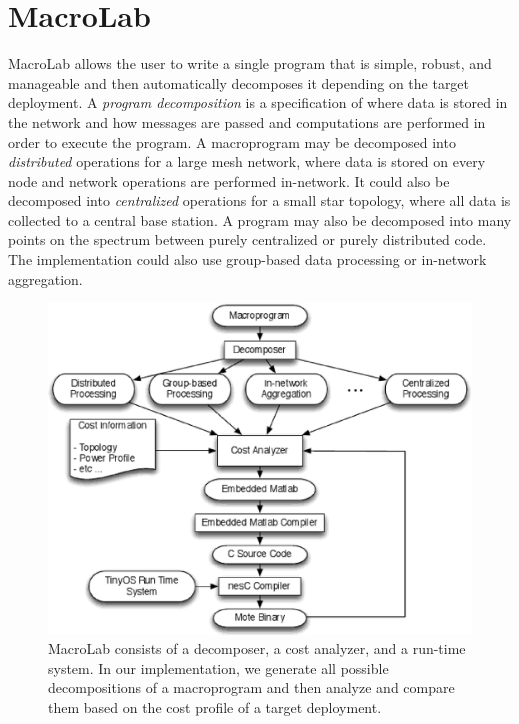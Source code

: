 \chapter{MacroLab} 
\label{sect:approach}

MacroLab allows the user to write a single program that is
simple, robust, and manageable and then automatically decomposes it
depending on the target deployment.  A {\em program decomposition} is
a specification of where data is stored in the network and how
messages are passed and computations are performed in order to execute
the program.  A macroprogram may be decomposed into {\em
  distributed} operations for a large mesh network, where data is
stored on every node and network operations are performed in-network.
It could also be decomposed into {\em centralized} operations for a
small star topology, where all data is collected to a central base
station.  A program may also be decomposed into many points on the
spectrum between purely centralized or purely distributed code. 
The implementation could also use group-based data processing
or in-network aggregation.


\begin{figure}[h]
  \centering
  \includegraphics[width=0.8\columnwidth]{fig/System.eps}
  \caption[MacroLab system architecture]{MacroLab consists of a decomposer, a
  cost analyzer, and a run-time system. In our implementation, we generate all
  possible decompositions of a macroprogram and then analyze and compare them
  based on the cost profile of a target deployment.}
  \label{fig:System}
\end{figure}

